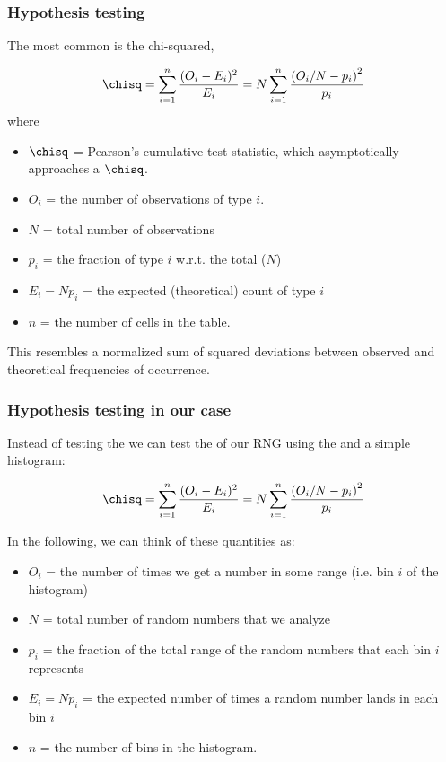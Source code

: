 \documentclass[hyperref={colorlinks=true}]{beamer}
\begin{document}
\begin{frame}[fragile]%
  \frametitle{Hypothesis testing}
  
  The most common  is the chi-squared, \chisq
  
  \begin{equation}
    \chisq = \sum_{i=1}^{n} \frac{(O_i - E_i)^2}{E_i} =  N \sum_{i=1}^n \frac{\left(O_i/N - p_i\right)^2}{p_i}
  \end{equation}
where

  \begin{itemize}  
    \item $\chisq$ = Pearson's cumulative test statistic, which asymptotically approaches a $\chisq$.
    \item $O_i$ = the number of observations of type $i$.
    \item $N$ = total number of observations
    \item $p_i$ = the fraction of type $i$ w.r.t. the total ($N$)
    \item $E_i = N p_i$ = the expected (theoretical) count of type $i$
    \item $n$ = the number of cells in the table.
  \end{itemize}
  
  This resembles a normalized sum of squared deviations between observed and theoretical frequencies of occurrence.
  
\end{frame}


\begin{frame}[fragile]%
  \frametitle{Hypothesis testing in our case}
  
  Instead of testing the  we can test the  of our RNG using the \chisq and a simple histogram:
  
  \begin{equation}
    \chisq = \sum_{i=1}^{n} \frac{(O_i - E_i)^2}{E_i} =  N \sum_{i=1}^n \frac{\left(O_i/N - p_i\right)^2}{p_i}
  \end{equation}

  In the following, we can think of these quantities as:

  \begin{itemize}  
    \item $O_i$ = the number of times we get a number in some range (i.e. bin $i$ of the histogram)
    \item $N$ = total number of random numbers that we analyze
    \item $p_i$ = the fraction of the total range of the random numbers that each bin $i$ represents
    \item $E_i = N p_i$ = the expected number of times a random number lands in each bin $i$
    \item $n$ = the number of bins in the histogram.
  \end{itemize}
    
\end{frame}
\end{document}
